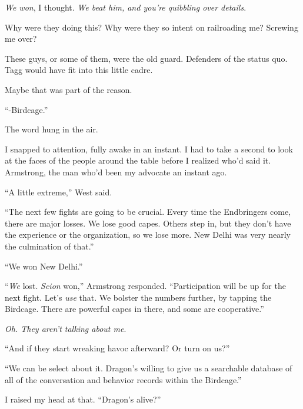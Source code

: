 \emph{We won}, I thought.  \emph{We beat him, and you're quibbling over details}.



Why were they doing this?  Why were they so intent on railroading me?  Screwing me over?



These guys, or some of them, were the old guard.  Defenders of the status quo.  Tagg would have fit into this little cadre.



Maybe that was part of the reason.



``-Birdcage.''



The word hung in the air.



I snapped to attention, fully awake in an instant.  I had to take a second to look at the faces of the people around the table before I realized who'd said it.  Armstrong, the man who'd been my advocate an instant ago.



``A little extreme,'' West said.



``The next few fights are going to be crucial.  Every time the Endbringers come, there are major losses.  We lose good capes.  Others step in, but they don't have the experience or the organization, so we lose more.  New Delhi was very nearly the culmination of that.''



``We won New Delhi.''



``\emph{We} lost.  \emph{Scion} won,'' Armstrong responded.  ``Participation will be up for the next fight.  Let's \emph{use} that.  We bolster the numbers further, by tapping the Birdcage.  There are powerful capes in there, and some are cooperative.''



\emph{Oh.  They aren't talking about me}.



``And if they start wreaking havoc afterward?  Or turn on us?''



``We can be select about it.  Dragon's willing to give us a searchable database of all of the conversation and behavior records within the Birdcage.''



I raised my head at that.  ``Dragon's alive?''



